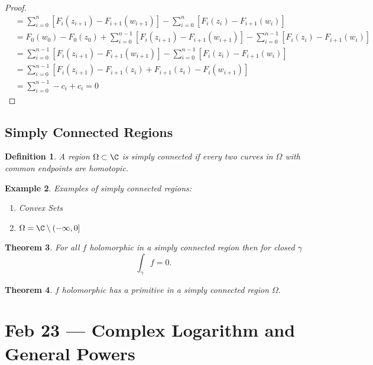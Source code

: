 \documentclass[a4paper]{article}
\newtheorem{thm}{Theorem}[section]
\newtheorem{defn}[thm]{Definition}
\newtheorem{eg}[thm]{Example}
\begin{document}
\begin{proof}
\begin{align*}
        &=\sum_{i=0}^n \left [ F_{i}(z_{i+1})-F_{i+1}(w_{i+1}) \right ]-\sum_{i=0}^n \left [ F_{i}(z_i)-F_{i+1}(w_i) \right ]\\
        &=F_0(w_0)-F_0(z_0)+\sum_{i=0}^{n-1} \left [ F_{i}(z_{i+1})-F_{i+1}(w_{i+1}) \right ]-\sum_{i=0}^{n-1} \left [ F_{i}(z_i)-F_{i+1}(w_i) \right ]\\
        &=\sum_{i=0}^{n-1} \left [ F_{i}(z_{i+1})-F_{i+1}(w_{i+1}) \right ]-\sum_{i=0}^{n-1} \left [ F_{i}(z_i)-F_{i+1}(w_i) \right ]\\
        &=\sum_{i=0}^{n-1} \left [ F_i(z_{i+1})-F_{i+1}(z_{i})+F_{i+1}(z_i)-F_{i}(w_{i+1}) \right ]\\
        &=\sum_{i=0}^{n-1}-c_i+c_i=0
    \end{align*}
\end{proof}
\subsection{Simply Connected Regions}
\begin{defn}
    A region $\Omega\subset \C$ is simply connected if every two curves in $\Omega$ with common endpoints are homotopic. 
\end{defn}
\begin{eg}
    Examples of simply connected regions:
    \begin{enumerate}
        \item Convex Sets
        \item $\Omega=\C\setminus (-\infty,0]$ 
    \end{enumerate}
\end{eg}
\begin{thm}
    For all $f$ holomorphic in a simply connected region then for closed $\gamma$
    \[
    \int_{\gamma} f=0
    .\] 
\end{thm}
\begin{thm}
    $f$ holomorphic has a primitive in a simply connected region $\Omega.$ 
\end{thm}
\newpage
\section{Feb 23 --- Complex Logarithm and General Powers}
\end{document}
